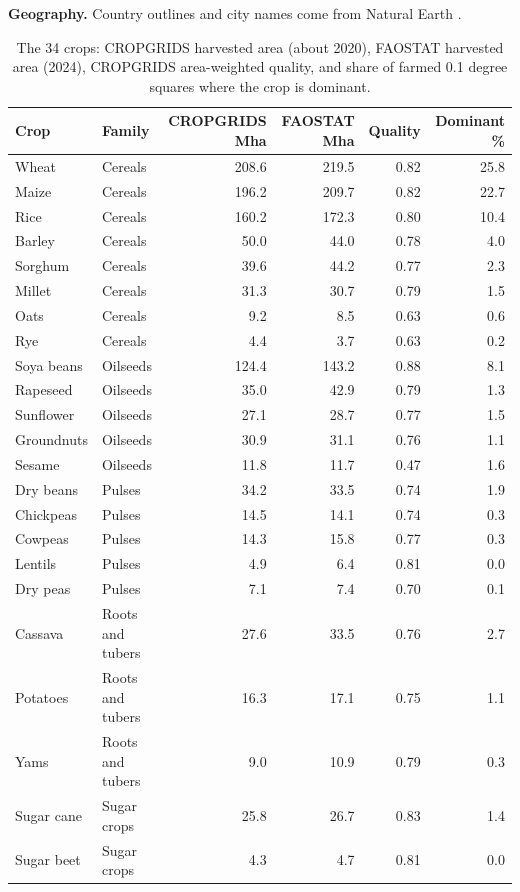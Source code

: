 \documentclass[11pt,a4paper]{article}
\begin{document}
\textbf{Geography.} Country outlines and city names come from Natural Earth \citep{naturalearth}.

\begin{table}[tbp]\centering\small\caption{The 34 crops: CROPGRIDS harvested area (about 2020), FAOSTAT harvested area (2024), CROPGRIDS area-weighted quality, and share of farmed 0.1 degree squares where the crop is dominant.}\label{tab:crops}\begin{tabular}{llrrrr}\toprule Crop & Family & CROPGRIDS Mha & FAOSTAT Mha & Quality & Dominant \%\\\midrule
Wheat & Cereals & 208.6 & 219.5 & 0.82 & 25.8\\
Maize & Cereals & 196.2 & 209.7 & 0.82 & 22.7\\
Rice & Cereals & 160.2 & 172.3 & 0.80 & 10.4\\
Barley & Cereals & 50.0 & 44.0 & 0.78 & 4.0\\
Sorghum & Cereals & 39.6 & 44.2 & 0.77 & 2.3\\
Millet & Cereals & 31.3 & 30.7 & 0.79 & 1.5\\
Oats & Cereals & 9.2 & 8.5 & 0.63 & 0.6\\
Rye & Cereals & 4.4 & 3.7 & 0.63 & 0.2\\
Soya beans & Oilseeds & 124.4 & 143.2 & 0.88 & 8.1\\
Rapeseed & Oilseeds & 35.0 & 42.9 & 0.79 & 1.3\\
Sunflower & Oilseeds & 27.1 & 28.7 & 0.77 & 1.5\\
Groundnuts & Oilseeds & 30.9 & 31.1 & 0.76 & 1.1\\
Sesame & Oilseeds & 11.8 & 11.7 & 0.47 & 1.6\\
Dry beans & Pulses & 34.2 & 33.5 & 0.74 & 1.9\\
Chickpeas & Pulses & 14.5 & 14.1 & 0.74 & 0.3\\
Cowpeas & Pulses & 14.3 & 15.8 & 0.77 & 0.3\\
Lentils & Pulses & 4.9 & 6.4 & 0.81 & 0.0\\
Dry peas & Pulses & 7.1 & 7.4 & 0.70 & 0.1\\
Cassava & Roots and tubers & 27.6 & 33.5 & 0.76 & 2.7\\
Potatoes & Roots and tubers & 16.3 & 17.1 & 0.75 & 1.1\\
Yams & Roots and tubers & 9.0 & 10.9 & 0.79 & 0.3\\
Sugar cane & Sugar crops & 25.8 & 26.7 & 0.83 & 1.4\\
Sugar beet & Sugar crops & 4.3 & 4.7 & 0.81 & 0.0\\

\end{tabular}
\end{table}
\end{document}
